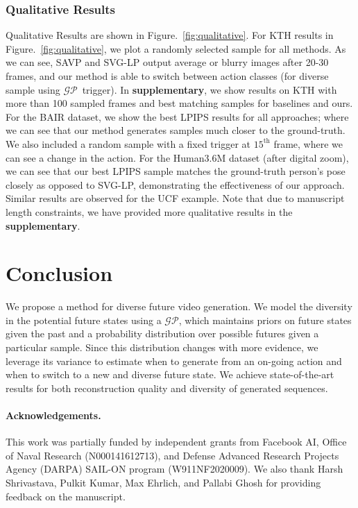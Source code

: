 \documentclass{article} \usepackage{iclr2021_conference,times}
\newcommand{\GP}{$\mathcal{GP}$}
\begin{document}
\subsubsection{Qualitative Results}
\vspace{-0.05in}
Qualitative Results are shown in Figure.~\ref{fig:qualitative}. For KTH results in  Figure.~\ref{fig:qualitative}, we plot a randomly selected sample for all methods. As we can see, SAVP and SVG-LP output average or blurry images after 20-30 frames, and our method is able to switch between action classes (for diverse sample using \GP\ trigger). In \textbf{supplementary}, we show results on KTH with more than 100 sampled frames and best matching samples for baselines and ours. For the BAIR dataset, we show the best LPIPS results for all approaches; where we can see that our method generates samples much closer to the ground-truth. We also included a random sample with a fixed trigger at $15^\text{th}$ frame, where we can see a change in the action. For the Human3.6M dataset (after digital zoom), we can see that our best LPIPS sample matches the ground-truth person's pose closely as opposed to SVG-LP, demonstrating the effectiveness of our approach. Similar results are observed for the UCF example. Note that due to manuscript length constraints, we have provided more qualitative results in the \textbf{supplementary}.




\vspace{-0.1in}
\section{Conclusion}
\vspace{-0.1in}
We propose a method for diverse future video generation. We model the diversity in the potential future states using a \GP, which maintains priors on future states given the past and a probability distribution over possible futures given a particular sample. Since this distribution changes with more evidence, we leverage its variance to estimate when to generate from an on-going action and when to switch to a new and diverse future state. We achieve state-of-the-art results for both reconstruction quality and diversity of generated sequences.

\paragraph{Acknowledgements.} This work was partially funded by independent grants from Facebook AI,  Office of Naval Research (N000141612713), and Defense Advanced Research Projects Agency (DARPA) SAIL-ON program (W911NF2020009). We also thank Harsh Shrivastava, Pulkit Kumar, Max Ehrlich, and Pallabi Ghosh for providing feedback on the manuscript.
\end{document}
